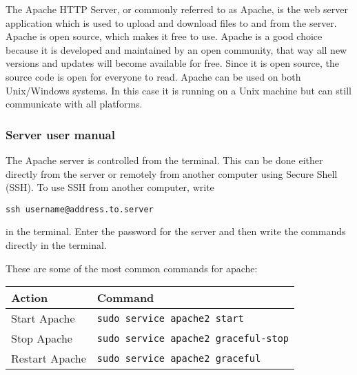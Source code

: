 The Apache HTTP Server, or commonly referred to as Apache, is the web server application which is used to upload and download files to and from the server. Apache is open source, which makes it free to use. Apache is a good choice because it is developed and maintained by an open community, that way all new versions and updates will become available for free. Since it is open source, the source code is open for everyone to read. Apache can be used on both Unix/Windows systems. In this case it is running on a Unix machine but can still communicate with all platforms. 

\subsubsection{Server user manual}
The Apache server is controlled from the terminal. This can be done either directly from the server or remotely from another computer using Secure Shell (SSH). To use SSH from another computer, write

\texttt{ssh username@address.to.server}

in the terminal. Enter the password for the server and then write the commands directly in the terminal.

These are some of the most common commands for apache: \\
\begin{tabular} {| l | l |}
\hline
\textbf{Action} & \textbf{Command} \\
\hline
Start Apache & \texttt{sudo service apache2 start} \\
\hline
Stop Apache & \texttt{sudo service apache2 graceful-stop} \\
\hline
Restart Apache & \texttt{sudo service apache2 graceful} \\
\hline
\end{tabular}